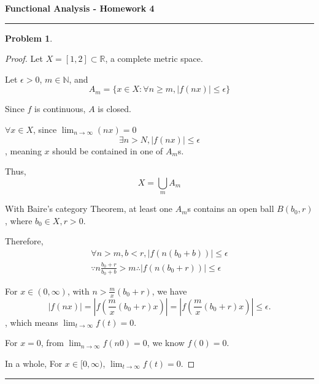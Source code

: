 \documentclass{article}
\newcommand{\abs}[1]{\left|#1\right|}
\newtheorem{problem}{Problem}
\begin{document}
\begin{center}
    \textbf{\Large Functional Analysis - Homework 4}
\end{center}

\hrule
\vspace{0.5em}


\begin{problem}

\end{problem}

\begin{proof}

    Let $X = [1,2] \subset \mathbb{R}$, a complete metric space.

    Let $\epsilon > 0$, $m \in \mathbb{N}$, and 
    $$
    A_m = \{ x \in X : \forall n \geq m, \abs{f(nx)} \leq \epsilon \}
    $$

    Since $f$ is continuous, $A$ is closed.

    $\forall x \in X$, since $\lim_{n \to \infty}(nx) = 0$
    $$
    \exists n > N, \abs{f(nx)} \leq \epsilon
    $$
    , meaning $x$ should be contained in one of $A_m$s.

    Thus,
    $$
    X = \bigcup_m A_m
    $$

    With Baire’s category Theorem, at least one $A_m$s contains an open ball $B(b_0, r)$, where $b_0 \in X, r > 0$.

    Therefore,
    \begin{gather}
    \forall n > m, b < r, \abs{f(n(b_0 + b))} \leq \epsilon 
    \\
    \because n\frac{b_0 + r}{b_0 + b} > m
    \therefore \abs{f(n(b_0 + r))} \leq \epsilon
    \end{gather}

    
    For $x \in (0, \infty)$, with $n > \frac{m}{x}(b_0 + r)$, we have
    $$
    \abs{f(nx)} = \abs{f(\frac{m}{x}(b_0 + r) x)}
    = \abs{f(\frac{m}{x}(b_0 + r) x)}  \leq \epsilon .
    $$
    , which means $\lim_{t \to \infty} f(t) = 0$.

    For $x = 0$, from $\lim_{n \to \infty} f(n 0) = 0$, we know $f(0) = 0$.

    In a whole, For $x \in [0, \infty)$, $\lim_{t \to \infty} f(t) = 0$.

    
\end{proof}

\hrule
\vspace{0.5em}
\end{document}
